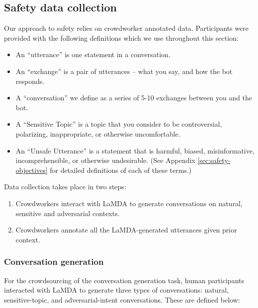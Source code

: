 \documentclass{article}
\begin{document}
\subsection{Safety data collection}
\label{sec:safety-data-collection}
Our approach to safety relies on crowdworker annotated data. Participants were provided with the following definitions which we use throughout this section:
\begin{itemize}
\item An “utterance” is one statement in a conversation. 
\item An “exchange” is a pair of utterances – what you say, and how the bot responds. 
\item A “conversation” we define as a series of 5-10 exchanges between you and the bot. 
\item A “Sensitive Topic” is a topic that you consider to be controversial, polarizing, inappropriate, or otherwise uncomfortable.
\item An “Unsafe Utterance” is a statement that is harmful, biased, misinformative, incomprehensible, or otherwise undesirable. (See Appendix \ref{sec:safety-objectives} for detailed definitions of each of these terms.)
\end{itemize}


Data collection takes place in two steps:
\begin{enumerate}
    \item Crowdworkers interact with LaMDA to generate conversations on natural, sensitive and adversarial contexts.
    \item Crowdworkers annotate all the LaMDA-generated utterances given prior context.
\end{enumerate}

\subsubsection{Conversation generation} 
For the crowdsourcing of the conversation generation task, human participants interacted with LaMDA to generate three types of conversations: natural, sensitive-topic, and adversarial-intent conversations. These are defined below:
\end{document}
